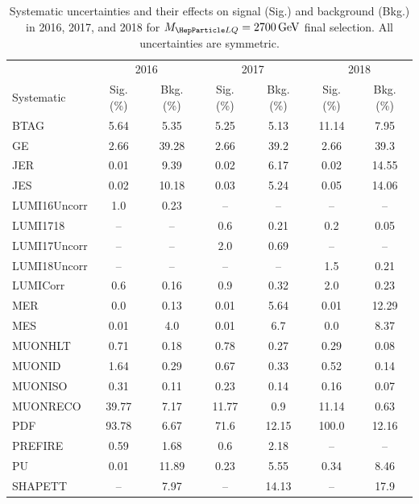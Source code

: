 \begin{table}[H]
	\begin{center}
        \begin{footnotesize}
			\caption{Systematic uncertainties and their effects on signal (Sig.) and background (Bkg.) in 2016, 2017, and 2018 for $\MLQ = \SI{2700}{GeV}$ final selection. All uncertainties are symmetric.}
			\begin{tabular}{lcccccc} \hline \hline
				& \multicolumn{2}{c}{2016} & \multicolumn{2}{c}{2017} & \multicolumn{2}{c}{2018} \\
				Systematic & Sig. (\%) & Bkg. (\%) & Sig. (\%) & Bkg. (\%) & Sig. (\%) & Bkg. (\%) \\ \hline
				BTAG &  5.64  &  5.35 &  5.25  &  5.13 &  11.14  &  7.95 \\
				GE &  2.66  &  39.28 &  2.66  &  39.2 &  2.66  &  39.3 \\
				JER &  0.01  &  9.39 &  0.02  &  6.17 &  0.02  &  14.55 \\
				JES &  0.02  &  10.18 &  0.03  &  5.24 &  0.05  &  14.06 \\
				LUMI16Uncorr &  1.0  &  0.23 & -- & -- & -- & -- \\
				LUMI1718 & -- & -- &  0.6  &  0.21 &  0.2  &  0.05 \\
				LUMI17Uncorr & -- & -- &  2.0  &  0.69 & -- & -- \\
				LUMI18Uncorr & -- & -- & -- & -- &  1.5  &  0.21 \\
				LUMICorr &  0.6  &  0.16 &  0.9  &  0.32 &  2.0  &  0.23 \\
				MER &  0.0  &  0.13 &  0.01  &  5.64 &  0.01  &  12.29 \\
				MES &  0.01  &  4.0 &  0.01  &  6.7 &  0.0  &  8.37 \\
				MUONHLT &  0.71  &  0.18 &  0.78  &  0.27 &  0.29  &  0.08 \\
				MUONID &  1.64  &  0.29 &  0.67  &  0.33 &  0.52  &  0.14 \\
				MUONISO &  0.31  &  0.11 &  0.23  &  0.14 &  0.16  &  0.07 \\
				MUONRECO &  39.77  &  7.17 &  11.77  &  0.9 &  11.14  &  0.63 \\
				PDF &  93.78  &  6.67 &  71.6  &  12.15 &  100.0  &  12.16 \\
				PREFIRE &  0.59  &  1.68 &  0.6  &  2.18 & -- & -- \\
				PU &  0.01  &  11.89 &  0.23  &  5.55 &  0.34  &  8.46 \\
				SHAPETT & -- &  7.97 & -- &  14.13 & -- &  17.9 \\

\end{tabular}
\end{footnotesize}
\end{center}
\end{table}
